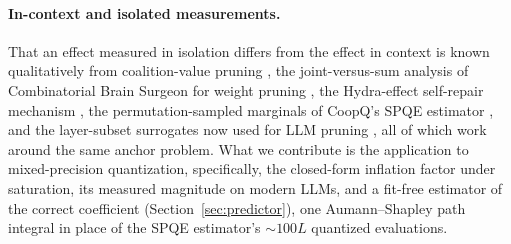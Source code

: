 \paragraph{In-context and isolated measurements.} That an effect measured in isolation differs from the effect in context
is known qualitatively from coalition-value pruning \citep{ancona2020shapley}, the joint-versus-sum
analysis of Combinatorial Brain Surgeon for weight pruning \citep{cbs2022}, the Hydra-effect self-repair
mechanism \citep{mcgrath2023hydra}, the permutation-sampled marginals of CoopQ's SPQE estimator
\citep{impq2025}, and the
layer-subset surrogates now used for LLM pruning \citep{pruninggame2026}, all of which work around the
same anchor problem. What we contribute is the application to mixed-precision quantization,
specifically, the closed-form inflation factor under saturation, its measured
magnitude on modern LLMs, and a fit-free estimator of the correct coefficient (Section~\ref{sec:predictor}), one
Aumann--Shapley path integral in place of the SPQE estimator's ${\sim}100L$ quantized evaluations.
